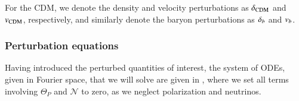 For the CDM, we denote the density and velocity perturbations as $\delta_\mathrm{CDM}$ and $v_\mathrm{CDM}$, respectively, and similarly denote the baryon perturbations as $\delta_b$ and $v_b$.  

\subsubsection{Perturbation equations}
Having introduced the perturbed quantities of interest, the system of ODEs, given in Fourier space, that we will solve are given in \cite[Eq. (22)]{callin}, where we set all terms involving $\Theta_P$ and $\mathcal{N}$ to zero, as we neglect polarization and neutrinos.   

